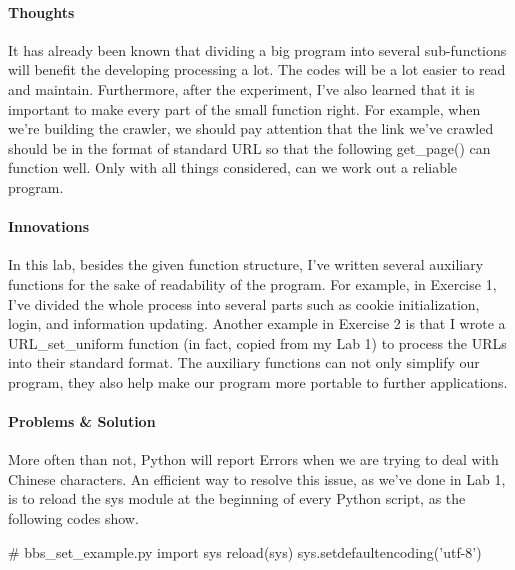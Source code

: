 \documentclass{article}
\begin{document}
\paragraph{Thoughts}
It has already been known that dividing a big program into several sub-functions will benefit the developing processing a lot. The codes will be a lot easier to read and maintain. Furthermore, after the experiment, I've also learned that it is important to make every part of the small function right. For example, when we're building the crawler, we should pay attention that the link we've crawled should be in the format of standard URL so that the following get\_page() can function well. Only with all things considered, can we work out a reliable program.

\paragraph{Innovations}
In this lab, besides the given function structure, I've written several auxiliary functions for the sake of readability of the program. For example, in Exercise 1, I've divided the whole process into several parts such as cookie initialization, login, and information updating. Another example in Exercise 2 is that I wrote a URL\_set\_uniform function (in fact, copied from my Lab 1) to process the URLs into their standard format. The auxiliary functions can not only simplify our program, they also help make our program more portable to further applications.


\paragraph{Problems \& Solution}
More often than not, Python will report Errors when we are trying to deal with Chinese characters. An efficient way to resolve this issue, as we've done in Lab 1, is to reload the sys module at the beginning of every Python script, as the following codes show. 

\begin{python}
# bbs_set_example.py
import sys
reload(sys)
sys.setdefaultencoding('utf-8')
\end{python}
\end{document}
